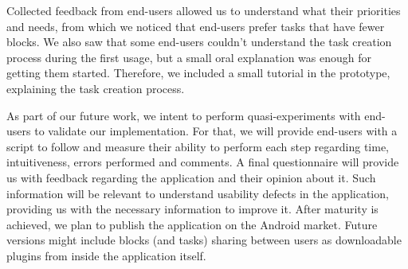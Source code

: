 \documentclass[9pt,a4paper]{extarticle}
\begin{document}
\begin{multicols}{2}
Collected feedback from end-users allowed us to understand what their priorities and needs, from which we noticed that end-users prefer tasks that have fewer blocks. We also saw that some end-users couldn't understand the task creation process during the first usage, but a small oral explanation was enough for getting them started. Therefore, we included a small tutorial in the prototype, explaining the task creation process.

As part of our future work, we intent to perform quasi-experiments with end-users to validate our implementation. For that, we will provide end-users with a script to follow and measure their ability to perform each step regarding time, intuitiveness, errors performed and comments. A final questionnaire will provide us with feedback regarding the application and their opinion about it. Such information will be relevant to understand usability defects in the application, providing us with the necessary information to improve it. After maturity is achieved, we plan to publish the application on the Android market. Future versions might include blocks (and tasks) sharing between users as downloadable plugins from inside the application itself.



\end{multicols}
\end{document}
